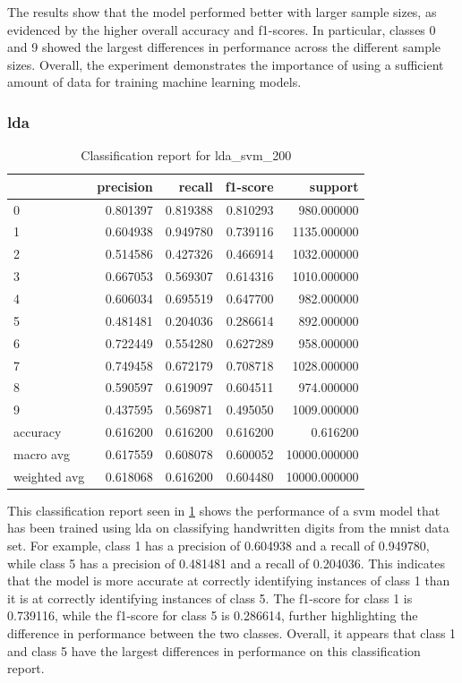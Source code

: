 The results show that the model performed better with larger sample sizes, as evidenced by the higher overall accuracy and f1-scores. In particular, classes 0 and 9 showed the largest differences in performance across the different sample sizes. Overall, the experiment demonstrates the importance of using a sufficient amount of data for training machine learning models.

\subsubsection{\gls{lda}}\label{subsubsec:experiment_4_lda}

\begin{table}[htb!]
    \centering
    \begin{tabular}{lrrrr}
        \toprule
    & precision & recall & f1-score & support \\
    \midrule
    0 & 0.801397 & 0.819388 & 0.810293 & 980.000000 \\
    1 & 0.604938 & 0.949780 & 0.739116 & 1135.000000 \\
    2 & 0.514586 & 0.427326 & 0.466914 & 1032.000000 \\
    3 & 0.667053 & 0.569307 & 0.614316 & 1010.000000 \\
    4 & 0.606034 & 0.695519 & 0.647700 & 982.000000 \\
    5 & 0.481481 & 0.204036 & 0.286614 & 892.000000 \\
    6 & 0.722449 & 0.554280 & 0.627289 & 958.000000 \\
    7 & 0.749458 & 0.672179 & 0.708718 & 1028.000000 \\
    8 & 0.590597 & 0.619097 & 0.604511 & 974.000000 \\
    9 & 0.437595 & 0.569871 & 0.495050 & 1009.000000 \\
    accuracy & 0.616200 & 0.616200 & 0.616200 & 0.616200 \\
    macro avg & 0.617559 & 0.608078 & 0.600052 & 10000.000000 \\
    weighted avg & 0.618068 & 0.616200 & 0.604480 & 10000.000000 \\
    \bottomrule
\end{tabular}
\caption{Classification report for lda\_svm\_200}
\label{tab:classification-report-lda_svm_200}
    \end{table}

This classification report seen in \ref{tab:classification-report-lda_svm_200} shows the performance of a \gls{svm} model that has been trained using \gls{lda} on classifying handwritten digits from the \gls{mnist} data set. For example, class 1 has a precision of 0.604938 and a recall of 0.949780, while class 5 has a precision of 0.481481 and a recall of 0.204036. This indicates that the model is more accurate at correctly identifying instances of class 1 than it is at correctly identifying instances of class 5. The f1-score for class 1 is 0.739116, while the f1-score for class 5 is 0.286614, further highlighting the difference in performance between the two classes. Overall, it appears that class 1 and class 5 have the largest differences in performance on this classification report.

